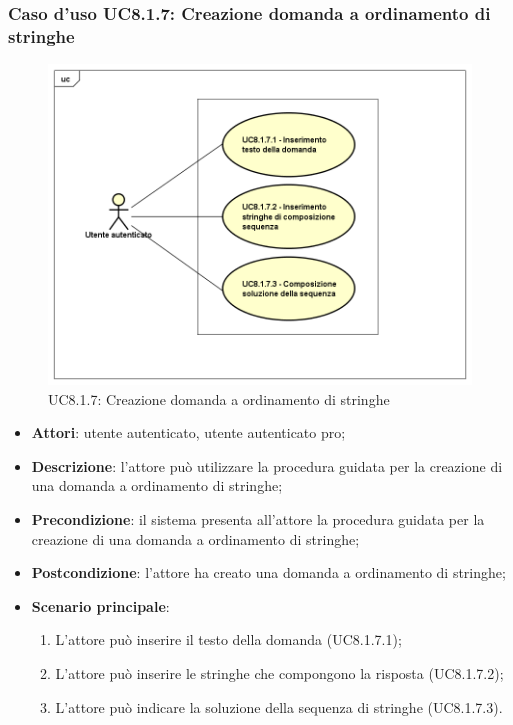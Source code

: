 \subsubsection{Caso d'uso UC8.1.7: Creazione domanda a ordinamento di stringhe}
	\label{UC8.1.7}
	\begin{figure}[ht]
		\centering
			\includegraphics[scale=0.45,keepaspectratio]{UML/UC8_1_7.png}
		\caption{UC8.1.7: Creazione domanda a ordinamento di stringhe}
	\end{figure}
	\FloatBarrier
\begin{itemize}
	\item\textbf{Attori}: utente autenticato, utente autenticato pro;
	\item\textbf{Descrizione}: l'attore può utilizzare la procedura guidata per la creazione di una domanda a ordinamento di stringhe;
	\item \textbf{Precondizione}: il sistema presenta all'attore la procedura guidata per la creazione di una domanda a ordinamento di stringhe; 
	\item\textbf{Postcondizione}: l'attore ha creato una domanda a ordinamento di stringhe;
	\item\textbf{Scenario principale}:
		\begin{enumerate}
			\item L'attore può inserire il testo della domanda (UC8.1.7.1);
			\item L'attore può inserire le stringhe che compongono la risposta (UC8.1.7.2);
			\item L'attore può indicare la soluzione della sequenza di stringhe (UC8.1.7.3).
		\end{enumerate}
\end{itemize}

